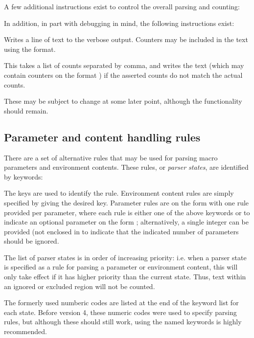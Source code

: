 \documentclass{article}
\begin{document}
A few additional \TeXcount{} instructions exist to control the overall parsing and counting:



In addition, in part with debugging in mind, the following \TeXcount{} instructions exist:

\begin{description}

Writes a line of text to the verbose output. Counters may be included in the text using the  format.

This takes a list of counts separated by comma, and writes the text (which may contain counters on the format ) if the asserted counts do not match the actual counts.

\end{description}

These may be subject to change at some later point, although the functionality should remain.


\subsection{Parameter and content handling rules}\label{subsec:TC_addrule}

There are a set of alternative rules that may be used for parsing macro parameters and environment contents. These rules, or \emph{parser states}, are identified by keywords:
%


The keys are used to identify the rule. Environment content rules are simply specified by giving the desired key. Parameter rules are on the form  with one rule provided per parameter, where each rule is either one of the above keywords or  to indicate an optional parameter on the form \code{[\ldots]}; alternatively, a single integer can be provided (not enclosed in \code{[]} to indicate that the indicated number of parameters should be ignored.

The list of parser states is in order of increasing priority: i.e. when a parser state is specified as a rule for parsing a parameter or environment content, this will only take effect if it has higher priority than the current state. Thus, text within an ignored or excluded region will not be counted.

The formerly used numberic codes are listed at the end of the keyword list for each state. Before version 4, these numeric codes were used to specify parsing rules, but although these should still work, using the named keywords is highly recommended.
\end{document}
